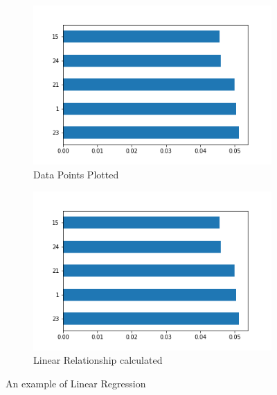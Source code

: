 \documentclass[a4paper,11pt,twoside]{article}
\begin{document}
\begin{figure} [h!]
  \centering
  \begin{subfigure}[b]{0.45\textwidth}
    \includegraphics[width=\textwidth]{extratreeclf.png}
    \caption{Data Points Plotted}
    \label{fig:1}
  \end{subfigure}
  \begin{subfigure}[b]{0.45\textwidth}
    \includegraphics[width=\textwidth]{extratreeclf.png}
    \caption{Linear Relationship calculated}
    \label{fig:2}
  \end{subfigure}
  \caption{An example of Linear Regression}
  \label{fig:3}
\end{figure}
\end{document}
